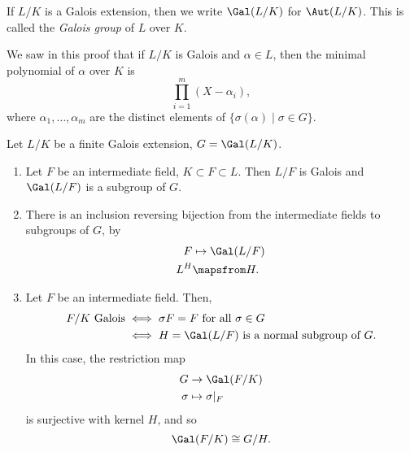 \documentclass[12pt]{article}
\begin{document}
\begin{definition}
	If $L/K$ is a Galois extension, then we write $\Gal(L/K)$ for $\Aut(L/K)$. This is called the \emph{Galois group} of $L$ over $K$.
\end{definition}


\begin{remark}
	We saw in this proof that if $L/K$ is Galois and $\alpha \in L$, then the minimal polynomial of $\alpha$ over $K$ is
	\[
	\prod_{i = 1}^{m} (X - \alpha_i),
	\]
	where $\alpha_1, \ldots, \alpha_m$ are the distinct elements of $\{\sigma(\alpha) \mid \sigma \in G\}$.
\end{remark}

\begin{theorem}
	Let $L/K$ be a finite Galois extension, $G = \Gal(L/K)$.
	\begin{enumerate}[\normalfont(i)]
		\item Let $F$ be an intermediate field, $K \subset F \subset L$. Then $L/F$ is Galois and $\Gal(L/F)$ is a subgroup of $G$.
		\item There is an inclusion reversing bijection from the intermediate fields to subgroups of $G$, by
			\begin{align*}
				F &\mapsto \Gal(L/F) \\
				L^H &\mapsfrom H.
			\end{align*}
		\item Let $F$ be an intermediate field. Then,
			\begin{align*}
				F/K \text{ Galois} &\iff \sigma F = F \text{ for all } \sigma \in G \\
						   &\iff H = \Gal(L/F) \text{ is a normal subgroup of } G.
			\end{align*}
			In this case, the restriction map
			\begin{align*}
				G &\to \Gal(F/K) \\
				\sigma &\mapsto \sigma|_F
			\end{align*}
			is surjective with kernel $H$, and so
			\[
			\Gal(F/K) \cong G/H.
			\]
	\end{enumerate}
\end{theorem}
\end{document}
